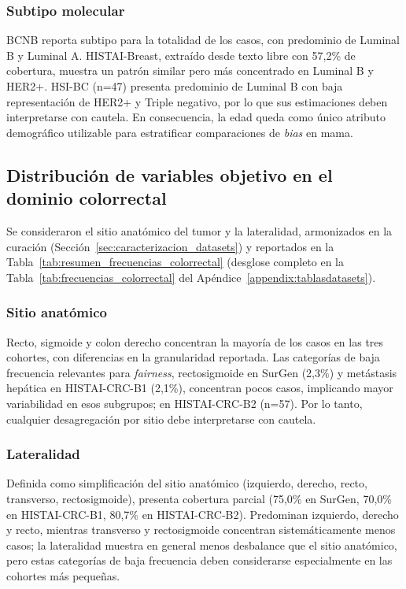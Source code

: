\subsubsection*{Subtipo molecular}

BCNB reporta subtipo para la totalidad de los casos, con predominio de Luminal B y Luminal A. HISTAI-Breast, extraído desde texto libre con 57,2\% de cobertura, muestra un patrón similar pero más concentrado en Luminal B y HER2+. HSI-BC (n=47) presenta predominio de Luminal B con baja representación de HER2+ y Triple negativo, por lo que sus estimaciones deben interpretarse con cautela. En consecuencia, la edad queda como único atributo demográfico utilizable para estratificar comparaciones de \textit{bias} en mama.

\subsection{Distribución de variables objetivo en el dominio colorrectal}

Se consideraron el sitio anatómico del tumor y la lateralidad, armonizados en la curación (Sección~\ref{sec:caracterizacion_datasets}) y reportados en la Tabla~\ref{tab:resumen_frecuencias_colorrectal} (desglose completo en la Tabla~\ref{tab:frecuencias_colorrectal} del Apéndice~\ref{appendix:tablasdatasets}).

\subsubsection*{Sitio anatómico}

Recto, sigmoide y colon derecho concentran la mayoría de los casos en las tres cohortes, con diferencias en la granularidad reportada. Las categorías de baja frecuencia relevantes para \textit{fairness}, rectosigmoide en SurGen (2,3\%) y metástasis hepática en HISTAI-CRC-B1 (2,1\%), concentran pocos casos, implicando mayor variabilidad en esos subgrupos; en HISTAI-CRC-B2 (n=57). Por lo tanto, cualquier desagregación por sitio debe interpretarse con cautela.

\subsubsection*{Lateralidad}

Definida como simplificación del sitio anatómico (izquierdo, derecho, recto, transverso, rectosigmoide), presenta cobertura parcial (75,0\% en SurGen, 70,0\% en HISTAI-CRC-B1, 80,7\% en HISTAI-CRC-B2). Predominan izquierdo, derecho y recto, mientras transverso y rectosigmoide concentran sistemáticamente menos casos; la lateralidad muestra en general menos desbalance que el sitio anatómico, pero estas categorías de baja frecuencia deben considerarse especialmente en las cohortes más pequeñas.

